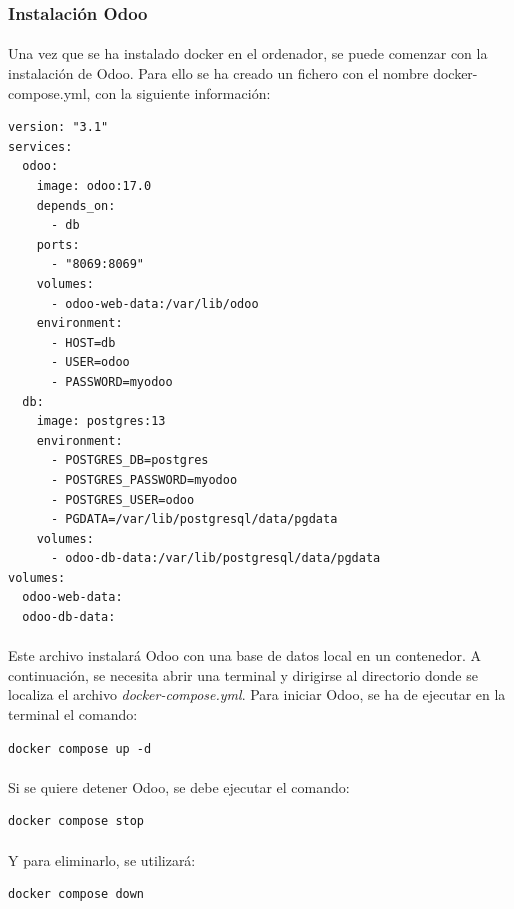 \subsubsection{Instalación Odoo}
\paragraph{}
Una vez que se ha instalado docker en el ordenador, se puede comenzar con la instalación de Odoo. Para ello se ha creado un fichero con el nombre docker-compose.yml, con la siguiente información:
\begin{lstlisting}[frame=single, basicstyle=\small]
version: "3.1"
services:
  odoo:
    image: odoo:17.0
    depends_on:
      - db
    ports:
      - "8069:8069"
    volumes:
      - odoo-web-data:/var/lib/odoo
    environment:
      - HOST=db
      - USER=odoo
      - PASSWORD=myodoo
  db:
    image: postgres:13
    environment:
      - POSTGRES_DB=postgres
      - POSTGRES_PASSWORD=myodoo
      - POSTGRES_USER=odoo
      - PGDATA=/var/lib/postgresql/data/pgdata
    volumes:
      - odoo-db-data:/var/lib/postgresql/data/pgdata
volumes:
  odoo-web-data:
  odoo-db-data:
\end{lstlisting}
\paragraph{}
Este archivo instalará Odoo con una base de datos local en un contenedor. A continuación, se necesita abrir una terminal y dirigirse al directorio donde se localiza el archivo \textit{docker-compose.yml}. Para iniciar Odoo, se ha de ejecutar en la terminal el comando:


\begin{lstlisting}[frame=single, basicstyle=\small]
docker compose up -d
\end{lstlisting}
\paragraph{}
Si se quiere detener Odoo, se debe ejecutar el comando:
\begin{lstlisting}[frame=single, basicstyle=\small]
docker compose stop
\end{lstlisting}
\paragraph{}
Y para eliminarlo, se utilizará:

\begin{lstlisting}[frame=single, basicstyle=\small]
docker compose down
\end{lstlisting}

